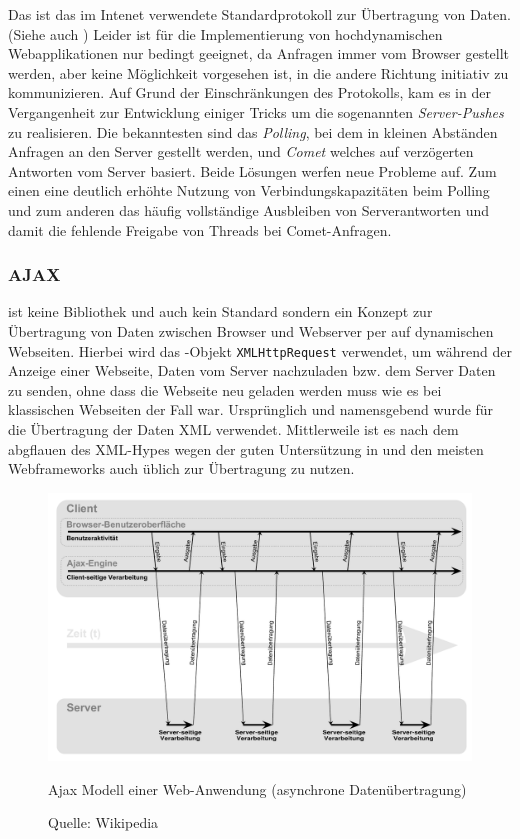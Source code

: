 Das  ist das im Intenet verwendete Standardprotokoll zur Übertragung von Daten. (Siehe
auch \cite{http}) Leider ist  für die Implementierung von hochdynamischen Webapplikationen
nur bedingt geeignet, da Anfragen immer vom Browser gestellt werden, aber keine Möglichkeit
vorgesehen ist, in die andere Richtung initiativ zu kommunizieren.  Auf Grund der Einschränkungen
des Protokolls, kam es in der Vergangenheit zur Entwicklung einiger Tricks um die sogenannten
\textit{Server-Pushes} zu realisieren. Die bekanntesten sind das \textit{Polling}, bei dem in
kleinen Abständen Anfragen an den Server gestellt werden, und \textit{Comet} welches auf verzögerten
Antworten vom Server basiert. Beide Lösungen werfen neue Probleme auf. Zum einen eine deutlich
erhöhte Nutzung von Verbindungskapazitäten beim Polling und zum anderen das häufig vollständige
Ausbleiben von Serverantworten und damit die fehlende Freigabe von Threads bei Comet-Anfragen.

\subsubsection{AJAX}

 ist keine Bibliothek und auch kein  Standard sondern ein Konzept zur Übertragung von
Daten  zwischen Browser und Webserver per  auf dynamischen Webseiten. Hierbei wird das
-Objekt \texttt{XMLHttpRequest} verwendet, um während der Anzeige einer Webseite, Daten vom
Server nachzuladen bzw. dem Server Daten zu senden, ohne dass die Webseite neu geladen werden muss
wie es bei klassischen Webseiten der Fall war. Ursprünglich und namensgebend wurde für die
Übertragung der Daten XML verwendet. Mittlerweile ist es nach dem abgflauen des XML-Hypes wegen der
guten Untersützung in  und den meisten Webframeworks auch üblich  zur Übertragung
zu nutzen. \cite{ajax}

\begin{figure}[ht]
\includegraphics[width=\linewidth]{images/diagram-ajax}
  \caption{Ajax Modell einer Web-Anwendung (asynchrone Datenübertragung)}
  \caption*{Quelle: Wikipedia}
  \label{fig:diagram-ajax}
\end{figure}


